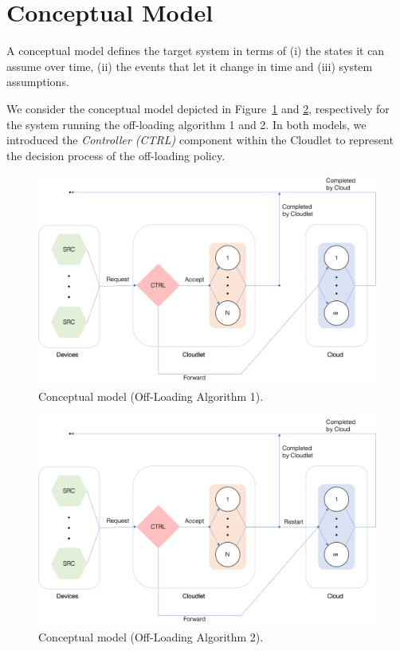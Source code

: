 \section{Conceptual Model}
\label{sec:performance-modeling-conceptual-model}
A conceptual model defines the target system in terms of 
(i) the states it can assume over time, 
(ii) the events that let it change in time and
(iii) system assumptions.

We consider the conceptual model depicted in Figure~\ref{fig:conceptual-model-1} and \ref{fig:conceptual-model-2}, respectively for the system running the off-loading algorithm 1 and 2.
In both models, we introduced the \textit{Controller (CTRL)} component within the Cloudlet to represent the decision process of the off-loading policy.

\begin{figure}
	\includegraphics[width=\columnwidth]{fig/conceptual-model-1}
	\caption{Conceptual model (Off-Loading Algorithm 1).}
	\label{fig:conceptual-model-1}
\end{figure}

\begin{figure}
	\includegraphics[width=\columnwidth]{fig/conceptual-model-2}
	\caption{Conceptual model (Off-Loading Algorithm 2).}
	\label{fig:conceptual-model-2}
\end{figure}

